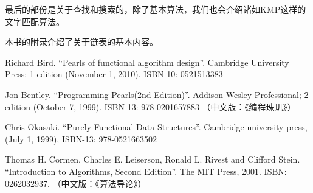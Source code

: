 \documentclass[UTF8]{article}
\begin{document}
最后的部份是关于查找和搜索的，除了基本算法，我们也会介绍诸如KMP这样的文字匹配算法。

本书的附录介绍了关于链表的基本内容。

\ifx\wholebook\relax \else
\begin{thebibliography}{99}

Richard Bird. ``Pearls of functional algorithm design''. Cambridge University Press; 1 edition (November 1, 2010). ISBN-10: 0521513383

Jon Bentley. ``Programming Pearls(2nd Edition)''. Addison-Wesley Professional; 2 edition (October 7, 1999). ISBN-13: 978-0201657883 （中文版：《编程珠玑》）

Chris Okasaki. ``Purely Functional Data Structures''. Cambridge university press, (July 1, 1999), ISBN-13: 978-0521663502

Thomas H. Cormen, Charles E. Leiserson, Ronald L. Rivest and Clifford Stein. ``Introduction to Algorithms, Second Edition''. The MIT Press, 2001. ISBN: 0262032937. （中文版：《算法导论》）

\end{thebibliography}

\expandafter\enddocument

\fi
\end{document}
